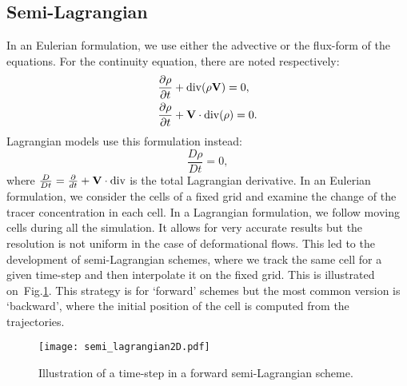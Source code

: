 \subsection{Semi-Lagrangian}
In an Eulerian formulation, we use either the advective or the flux-form of the
equations. For the continuity equation, there are noted respectively:
\begin{align}
  \frac{\partial \rho}{\partial t} &+ {\rm div}(\rho {\bf V}) = 0,\\
\label{eqn:cont_flux}
  \frac{\partial \rho}{\partial t} &+ {\bf V}\cdot{\rm div}(\rho) = 0.
\end{align}
Lagrangian models use this formulation instead:
\begin{equation}
\label{eqn:cont_lagrang}
  \frac{D \rho}{Dt} = 0,
\end{equation}
where $\frac{D}{Dt}=\frac{\partial}{dt} + {\bf V}\cdot{\rm div}$ is the total
Lagrangian derivative. In an Eulerian formulation, we consider the cells of a
fixed grid and examine the change of the tracer concentration in each cell. In a
Lagrangian formulation, we follow moving cells during all the simulation.  It
allows for very accurate results but the resolution is not uniform in the case
of deformational flows.
This led to the development of semi-Lagrangian schemes, where we track the same
cell for a given time-step and then interpolate it on the fixed grid. This is
illustrated on~Fig.\ref{fig:semi-lagrang}. This strategy is for `forward'
schemes but the most common version is `backward', where the initial position
of the cell is computed from the trajectories.
\begin{figure}
  \centering
  \texttt{[image: semi\_lagrangian2D.pdf]}
  \caption{Illustration of a time-step in a forward semi-Lagrangian scheme.}
\label{fig:semi-lagrang}
\end{figure}

